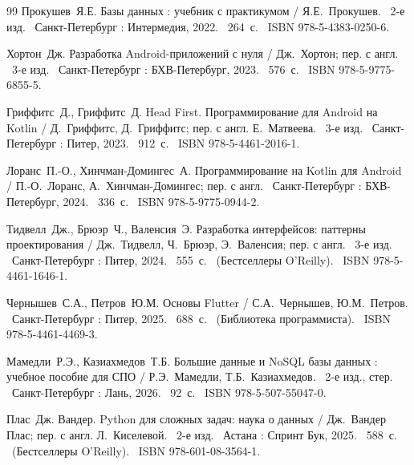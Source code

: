 \begin{thebibliography}{99}
	Прокушев~Я.Е. Базы данных : учебник с практикумом / Я.Е.~Прокушев. \textemdash\ 2-е изд. \textemdash\ Санкт-Петербург : Интермедия, 2022. \textemdash\ 264~с. \textemdash\ ISBN 978-5-4383-0250-6.

	Хортон~Дж. Разработка Android-приложений с нуля / Дж.~Хортон; пер. с англ. \textemdash\ 3-е изд. \textemdash\ Санкт-Петербург : БХВ-Петербург, 2023. \textemdash\ 576~с. \textemdash\ ISBN 978-5-9775-6855-5.

	Гриффитс~Д., Гриффитс~Д. Head First. Программирование для Android на Kotlin / Д.~Гриффитс, Д.~Гриффитс; пер. с англ. Е.~Матвеева. \textemdash\ 3-е изд. \textemdash\ Санкт-Петербург : Питер, 2023. \textemdash\ 912~с. \textemdash\ ISBN 978-5-4461-2016-1.

	Лоранс~П.-О., Хинчман-Домингес~А. Программирование на Kotlin для Android / П.-О.~Лоранс, А.~Хинчман-Домингес; пер. с англ. \textemdash\ Санкт-Петербург : БХВ-Петербург, 2024. \textemdash\ 336~с. \textemdash\ ISBN 978-5-9775-0944-2.

	Тидвелл~Дж., Брюэр~Ч., Валенсия~Э. Разработка интерфейсов: паттерны проектирования / Дж.~Тидвелл, Ч.~Брюэр, Э.~Валенсия; пер. с англ. \textemdash\ 3-е изд. \textemdash\ Санкт-Петербург : Питер, 2024. \textemdash\ 555~с. \textemdash\ (Бестселлеры O'Reilly). \textemdash\ ISBN 978-5-4461-1646-1.

	Чернышев~С.А., Петров~Ю.М. Основы Flutter / С.А.~Чернышев, Ю.М.~Петров. \textemdash\ Санкт-Петербург : Питер, 2025. \textemdash\ 688~с. \textemdash\ (Библиотека программиста). \textemdash\ ISBN 978-5-4461-4469-3.

	Мамедли~Р.Э., Казиахмедов~Т.Б. Большие данные и NoSQL базы данных : учебное пособие для СПО / Р.Э.~Мамедли, Т.Б.~Казиахмедов. \textemdash\ 2-е изд., стер. \textemdash\ Санкт-Петербург : Лань, 2026. \textemdash\ 92~с. \textemdash\ ISBN 978-5-507-55047-0.

	Плас~Дж. Вандер. Python для сложных задач: наука о данных / Дж.~Вандер Плас; пер. с англ. Л.~Киселевой. \textemdash\ 2-е изд. \textemdash\ Астана : Спринт Бук, 2025. \textemdash\ 588~с. \textemdash\ (Бестселлеры O'Reilly). \textemdash\ ISBN 978-601-08-3564-1.

\end{thebibliography}
